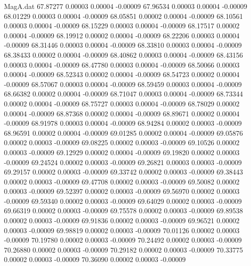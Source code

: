 \begin{filecontents}{MagA.dat}
  67.87277    0.00003    0.00004   -0.00009
  67.96534    0.00003    0.00004   -0.00009
  68.01229    0.00003    0.00004   -0.00009
  68.05851    0.00002    0.00004   -0.00009
  68.10561    0.00003    0.00004   -0.00009
  68.15229    0.00003    0.00004   -0.00009
  68.17517    0.00002    0.00004   -0.00009
  68.19912    0.00002    0.00004   -0.00009
  68.22206    0.00003    0.00004   -0.00009
  68.31446    0.00003    0.00004   -0.00009
  68.33810    0.00003    0.00004   -0.00009
  68.38433    0.00002    0.00004   -0.00009
  68.40862    0.00003    0.00004   -0.00009
  68.43156    0.00003    0.00004   -0.00009
  68.47780    0.00003    0.00004   -0.00009
  68.50066    0.00003    0.00004   -0.00009
  68.52343    0.00002    0.00004   -0.00009
  68.54723    0.00002    0.00004   -0.00009
  68.57067    0.00003    0.00004   -0.00009
  68.59459    0.00003    0.00004   -0.00009
  68.66382    0.00002    0.00004   -0.00009
  68.71047    0.00003    0.00004   -0.00009
  68.73344    0.00002    0.00004   -0.00009
  68.75727    0.00003    0.00004   -0.00009
  68.78029    0.00002    0.00004   -0.00009
  68.87368    0.00002    0.00004   -0.00009
  68.89671    0.00002    0.00004   -0.00009
  68.91978    0.00003    0.00004   -0.00009
  68.94284    0.00002    0.00003   -0.00009
  68.96591    0.00002    0.00004   -0.00009
  69.01285    0.00002    0.00004   -0.00009
  69.05876    0.00002    0.00003   -0.00009
  69.08225    0.00002    0.00003   -0.00009
  69.10526    0.00002    0.00003   -0.00009
  69.12929    0.00002    0.00004   -0.00009
  69.19820    0.00002    0.00003   -0.00009
  69.24524    0.00002    0.00003   -0.00009
  69.26821    0.00003    0.00003   -0.00009
  69.29157    0.00002    0.00003   -0.00009
  69.33742    0.00002    0.00003   -0.00009
  69.38443    0.00002    0.00003   -0.00009
  69.47708    0.00002    0.00003   -0.00009
  69.50082    0.00002    0.00003   -0.00009
  69.52397    0.00002    0.00003   -0.00009
  69.56970    0.00002    0.00003   -0.00009
  69.59340    0.00002    0.00003   -0.00009
  69.64029    0.00002    0.00003   -0.00009
  69.66319    0.00002    0.00003   -0.00009
  69.75578    0.00002    0.00003   -0.00009
  69.89538    0.00002    0.00003   -0.00009
  69.91836    0.00002    0.00003   -0.00009
  69.96521    0.00002    0.00003   -0.00009
  69.98819    0.00002    0.00003   -0.00009
  70.01126    0.00002    0.00003   -0.00009
  70.19780    0.00002    0.00003   -0.00009
  70.24492    0.00002    0.00003   -0.00009
  70.26880    0.00002    0.00003   -0.00009
  70.29182    0.00002    0.00003   -0.00009
  70.33775    0.00002    0.00003   -0.00009
  70.36090    0.00002    0.00003   -0.00009

\end{filecontents}
